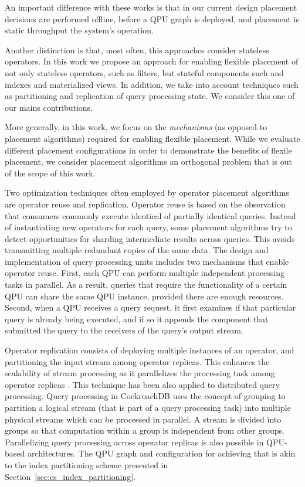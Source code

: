 An important difference with these works is that in our current design placement decisions are performed offline,
before a QPU graph is deployed, and placement is static throughput the system's operation.

Another distinction is that, most often, this approaches consider stateless operators.
In this work we propose an approach for enabling flexible placement of not only stateless operators, such as
filters, but stateful components such and indexes and materialized views.
In addition, we take into account techniques such as partitioning and replication of query processing state.
We consider this one of our mains contributions.

More generally, in this work, we focus on the \textit{mechanisms} (as opposed to placement algorithms)
required for enabling flexible placement.
While we evaluate different placement configurations in order to demonstrate the benefits of flexile placement,
we consider placement algorithms an orthogonal problem that is out of the scope of this work.

\bigskip
\noindent
Two optimization techniques often employed by operator placement algorithms are operator reuse and replication.
Operator reuse is based on the observation that consumers commonly execute identical of partially identical queries.
Instead of instantiating new operators for each query,
some placement algorithms \cite{pietzuch:networkawareopplacement} try to detect opportunities for sharding intermediate results across queries.
This avoids transmitting multiple redundant copies of the same data.
The design and implementation of query processing units includes two mechanisms that enable operator reuse.
First, each QPU can perform multiple independent processing tasks in parallel.
As a result, queries that require the functionality of a certain QPU can share the same QPU instance,
provided there are enough resources.
Second, when a QPU receives a query request, it first examines if that particular query is already being executed,
and if so it appends the component that submitted the query to the receivers of the query's output stream.

Operator replication consists of deploying multiple instances of an operator,
and partitioning the input stream among operator replicas.
This enhances the scalability of stream processing as it parallelizes the processing task among operator replicas
\cite{stonebraker:streamprocessingrequirements}.
This technique has been also applied to distributed query processing.
Query processing in CockroachDB \cite{cockroachdb:distsql} uses the concept of grouping to partition a logical stream
(that is part of a query processing task) into multiple physical streams which can be processed in parallel.
A stream is divided into groups so that computation within a group is independent from other groups.
Parallelizing query processing across operator replicas is also possible in QPU-based architectures.
The QPU graph and configuration for achieving that is akin to the index partitioning scheme presented in Section~\ref{sec:cs_index_partitioning}.

